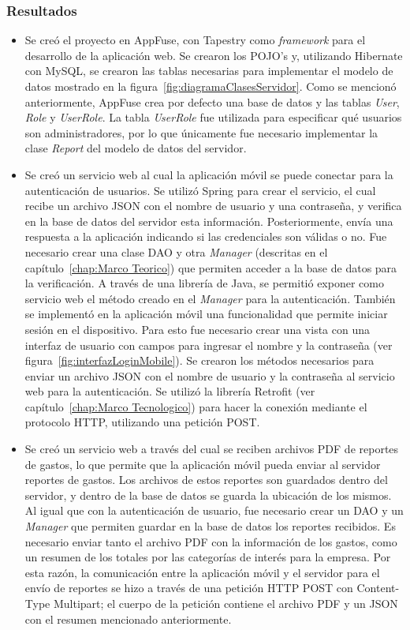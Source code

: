 \subsubsection{Resultados}
\begin{itemize}
\item Se creó el proyecto en AppFuse, con Tapestry como \textit{framework} para el desarrollo de la aplicación web. Se crearon los POJO's y, utilizando Hibernate con MySQL, se crearon las tablas necesarias para implementar el modelo de datos mostrado en la figura~\ref{fig:diagramaClasesServidor}. Como se mencionó anteriormente, AppFuse crea por defecto una base de datos y las tablas \textit{User}, \textit{Role} y \textit{UserRole}. La tabla \textit{UserRole} fue utilizada para especificar qué usuarios son administradores, por lo que únicamente fue necesario implementar la clase \textit{Report} del modelo de datos del servidor.
\item Se creó un servicio web al cual la aplicación móvil se puede conectar para la autenticación de usuarios. Se utilizó Spring para crear el servicio, el cual recibe un archivo JSON con el nombre de usuario y una contraseña, y verifica en la base de datos del servidor esta información. Posteriormente, envía una respuesta a la aplicación indicando si las credenciales son válidas o no. Fue necesario crear una clase DAO y otra \textit{Manager} (descritas en el capítulo~\ref{chap:Marco Teorico}) que permiten acceder a la base de datos para la verificación. A través de una librería de Java, se permitió exponer como servicio web el método creado en el \textit{Manager} para la autenticación.
También se implementó en la aplicación móvil una funcionalidad que permite iniciar sesión en el dispositivo. Para esto fue necesario crear una vista con una interfaz de usuario con campos para ingresar el nombre y la contraseña (ver figura~\ref{fig:interfazLoginMobile}). Se crearon los métodos necesarios para enviar un archivo JSON con el nombre de usuario y la contraseña al servicio web para la autenticación. Se utilizó la librería Retrofit (ver capítulo~\ref{chap:Marco Tecnologico}) para hacer la conexión mediante el protocolo HTTP, utilizando una petición POST.
\item Se creó un servicio web a través del cual se reciben archivos PDF de reportes de gastos, lo que permite que la aplicación móvil pueda enviar al servidor reportes de gastos. Los archivos de estos reportes son guardados dentro del servidor, y dentro de la base de datos se guarda la ubicación de los mismos. Al igual que con la autenticación de usuario, fue necesario crear un DAO y un \textit{Manager} que permiten guardar en la base de datos los reportes recibidos. Es necesario enviar tanto el archivo PDF con la información de los gastos, como un resumen de los totales por las categorías de interés para la empresa. Por esta razón, la comunicación entre la aplicación móvil y el servidor para el envío de reportes se hizo a través de una petición HTTP POST con Content-Type Multipart; el cuerpo de la petición contiene el archivo PDF y un JSON con el resumen mencionado anteriormente.


\end{itemize}
